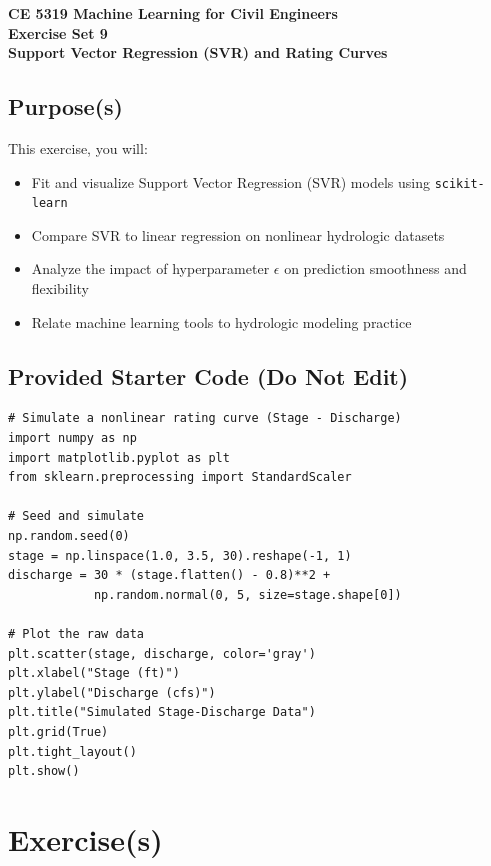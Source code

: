 \documentclass[12pt]{article}
\begin{document}
\begin{center}
{\textbf{{ CE 5319 Machine Learning for Civil Engineers} \\ {Exercise Set 9} \\ {Support Vector Regression (SVR) and Rating Curves } }}
\end{center}

\subsection*{Purpose(s)}
This exercise, you will:
\begin{itemize}
    \item Fit and visualize Support Vector Regression (SVR) models using \texttt{scikit-learn}
    \item Compare SVR to linear regression on nonlinear hydrologic datasets
    \item Analyze the impact of hyperparameter $\epsilon$ on prediction smoothness and flexibility
    \item Relate machine learning tools to hydrologic modeling practice
\end{itemize}







\subsection*{Provided Starter Code (Do Not Edit)}
\begin{verbatim}
# Simulate a nonlinear rating curve (Stage - Discharge)
import numpy as np
import matplotlib.pyplot as plt
from sklearn.preprocessing import StandardScaler

# Seed and simulate
np.random.seed(0)
stage = np.linspace(1.0, 3.5, 30).reshape(-1, 1)
discharge = 30 * (stage.flatten() - 0.8)**2 + 
            np.random.normal(0, 5, size=stage.shape[0])

# Plot the raw data
plt.scatter(stage, discharge, color='gray')
plt.xlabel("Stage (ft)")
plt.ylabel("Discharge (cfs)")
plt.title("Simulated Stage-Discharge Data")
plt.grid(True)
plt.tight_layout()
plt.show()
\end{verbatim}

\clearpage

\section*{\small{Exercise(s)}}
\end{document}
